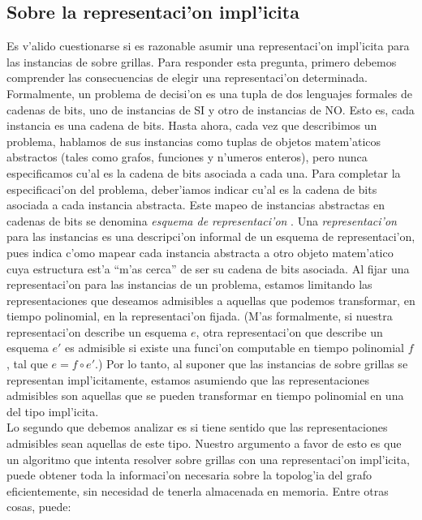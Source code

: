 \subsection{Sobre la representaci'on impl'icita}

Es v'alido cuestionarse si es razonable asumir una representaci'on impl'icita para las instancias de  sobre grillas. Para responder esta pregunta, primero debemos comprender las consecuencias de elegir una representaci'on determinada. Formalmente, un problema de decisi'on es una tupla de dos lenguajes formales de cadenas de bits, uno de instancias de SI y otro de instancias de NO. Esto es, cada instancia es una cadena de bits. Hasta ahora, cada vez que describimos un problema, hablamos de sus instancias como tuplas de objetos matem'aticos abstractos (tales como grafos, funciones y n'umeros enteros), pero nunca especificamos cu'al es la cadena de bits asociada a cada una. Para completar la especificaci'on del problema, deber'iamos indicar cu'al es la cadena de bits asociada a cada instancia abstracta. Este mapeo de instancias abstractas en cadenas de bits se denomina \textit{esquema de representaci'on} \cite[p. 19]{Ga79}. Una \textit{representaci'on} para las instancias es una descripci'on informal de un esquema de representaci'on, pues indica c'omo mapear cada instancia abstracta a otro objeto matem'atico cuya estructura est'a ``m'as cerca'' de ser su cadena de bits asociada. Al fijar una representaci'on para las instancias de un problema, estamos limitando las representaciones que deseamos admisibles a aquellas que podemos transformar, en tiempo polinomial, en la representaci'on fijada. (M'as formalmente, si nuestra representaci'on describe un esquema $e$, otra representaci'on que describe un esquema $e'$ es admisible si existe una funci'on computable en tiempo polinomial $f$, tal que $e = f \circ e'$.) Por lo tanto, al suponer que las instancias de  sobre grillas se representan impl'icitamente, estamos asumiendo que las representaciones admisibles son aquellas que se pueden transformar en tiempo polinomial en una del tipo impl'icita.\\

Lo segundo que debemos analizar es si tiene sentido que las representaciones admisibles sean aquellas de este tipo. Nuestro argumento a favor de esto es que un algoritmo que intenta resolver  sobre grillas con una representaci'on impl'icita, puede obtener toda la informaci'on necesaria sobre la topolog'ia del grafo eficientemente, sin necesidad de tenerla almacenada en memoria. Entre otras cosas, puede:

